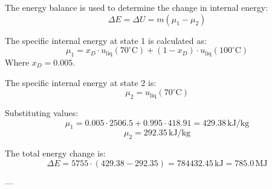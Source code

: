 The energy balance is used to determine the change in internal energy:  
\[
\Delta E = \Delta U = m (\mu_1 - \mu_2)
\]  

The specific internal energy at state 1 is calculated as:  
\[
\mu_1 = x_D \cdot u_{\text{liq}}(70^\circ\text{C}) + (1 - x_D) \cdot u_{\text{liq}}(100^\circ\text{C})
\]  
Where \( x_D = 0.005 \).  

The specific internal energy at state 2 is:  
\[
\mu_2 = u_{\text{liq}}(70^\circ\text{C})
\]  

Substituting values:  
\[
\mu_1 = 0.005 \cdot 2506.5 + 0.995 \cdot 418.91 = 429.38 \, \text{kJ/kg}
\]  
\[
\mu_2 = 292.35 \, \text{kJ/kg}
\]  

The total energy change is:  
\[
\Delta E = 5755 \cdot (429.38 - 292.35) = 784432.45 \, \text{kJ} = 785.0 \, \text{MJ}
\]  

---